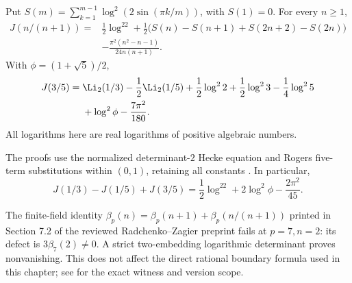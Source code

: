 \begin{theorem}
\label{hjr:thm:evaluations}
Put $S(m)=\sum_{k=1}^{m-1}\log^2(2\sin(\pi k/m))$, with $S(1)=0$.
For every $n\ge1$,
\[
\begin{split}
 J(n/(n+1))={}&\frac12\log^22
 +\frac12\bigl(S(n)-S(n+1)+S(2n+2)-S(2n)\bigr)\\
 &-\frac{\pi^2(n^2-n-1)}{24n(n+1)}.
\end{split}
\]
With $\phi=(1+\sqrt5)/2$,
\[
\begin{split}
 J(3/5)={}&\Li_2(1/3)-\frac12\Li_2(1/5)
 +\frac12\log^22+\frac12\log^23-\frac14\log^25\\
 &+\log^2\phi-\frac{7\pi^2}{180}.
\end{split}
\]
All logarithms here are real logarithms of positive algebraic numbers.
\end{theorem}

The proofs use the normalized determinant-$2$ Hecke equation and Rogers
five-term substitutions within $(0,1)$, retaining all constants
\cite[Section 6]{hergj:continuation}. In particular,
\[
 J(1/3)-J(1/5)+J(3/5)
 =\frac12\log^22+2\log^2\phi-\frac{2\pi^2}{45}.
\]

\begin{remark}
\label{hjr:rem:audit}
The finite-field identity
$\beta_p(n)=\beta_p(n+1)+\beta_p(n/(n+1))$ printed in
Section 7.2 of the reviewed Radchenko--Zagier preprint fails at $p=7,n=2$:
its defect is $3\beta_7(2)\ne0$. A strict two-embedding logarithmic
determinant proves nonvanishing. This does not affect the direct rational
boundary formula used in this chapter; see
\cite[Section 7]{hergj:continuation} for the exact witness and version scope.
\end{remark}
